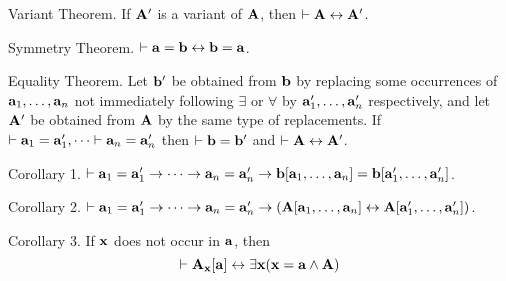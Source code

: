 \proclaim Variant Theorem. If ${\bf A}'$ is a variant of ${\bf A}$, then $\vdash {\bf A} \leftrightarrow {\bf A}'$.

\proclaim Symmetry Theorem. $\vdash {\bf a} = {\bf b} \leftrightarrow {\bf b} = {\bf a}$.

\proclaim Equality Theorem. Let ${\bf b}'$ be obtained from ${\bf b}$ by replacing some occurrences of ${\bf a}_1, \dots, {\bf a}_n$
not immediately following $\exists$ or $\forall$ by ${\bf a}_1', \dots, {\bf a}_n'$ respectively, and let ${\bf A}'$ be
obtained from ${\bf A}$ by the same type of replacements. If $\vdash {\bf a}_1 = {\bf a}_1', \dots \vdash {\bf a}_n = {\bf a}_n'$ then
$\vdash {\bf b} = {\bf b}'$ and $\vdash {\bf A} \leftrightarrow {\bf A}'$.

\proclaim Corollary 1. $\vdash {\bf a}_1 = {\bf a}_1' \to \cdots \to {\bf a}_n = {\bf a}_n' \to {\bf b}[{\bf a}_1, \dots, {\bf a}_n] = {\bf b}[{\bf a}_1', \dots, {\bf a}_n']$.

\proclaim Corollary 2. $\vdash {\bf a}_1 = {\bf a}_1' \to \cdots \to {\bf a}_n = {\bf a}_n' \to ({\bf A}[{\bf a}_1, \dots, {\bf a}_n] \leftrightarrow {\bf A}[{\bf a}_1', \dots, {\bf a}_n'])$.

\proclaim Corollary 3. If ${\bf x}$ does not occur in ${\bf a}$, then
$$
\vdash {\bf A}_{\bf x}[{\bf a}] \leftrightarrow \exists{\bf x} ({\bf x}={\bf a} \land {\bf A})
$$

\vfill
\break
